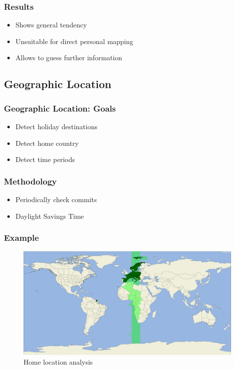 \documentclass{beamer}
\begin{document}
\begin{frame}
    \frametitle{Results}
    \begin{itemize}
        \item Shows general tendency
        \pause{}
        \item Unsuitable for direct personal mapping
        \pause{}
        \item Allows to guess further information
    \end{itemize}
\end{frame}


\subsection{Geographic Location}
\begin{frame}
    \frametitle{Geographic Location: Goals}
    \begin{itemize}
        \item Detect holiday destinations
        \pause{}
        \item Detect home country
        \pause{}
        \item Detect time periods
    \end{itemize}
\end{frame}

\begin{frame}
    \frametitle{Methodology}
    \begin{itemize}
        \item Periodically check commits
        \pause{}
        \item Daylight Savings Time
    \end{itemize}
\end{frame}

\begin{frame}
    \frametitle{Example}
    \begin{figure}[H]
        \includegraphics[scale=0.06]{analysis/author-home-location}
        \centering
        \caption{Home location analysis}
    \end{figure}
\end{frame}
\end{document}
